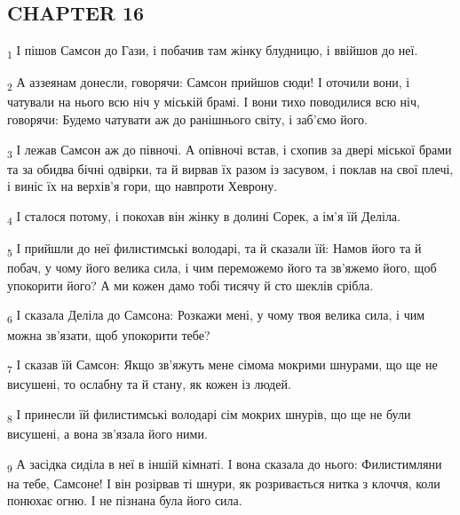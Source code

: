 \subsection{CHAPTER 16}
\begin{tcolorbox}
\textsubscript{1} І пішов Самсон до Гази, і побачив там жінку блудницю, і ввійшов до неї.
\end{tcolorbox}
\begin{tcolorbox}
\textsubscript{2} А аззеянам донесли, говорячи: Самсон прийшов сюди! І оточили вони, і чатували на нього всю ніч у міській брамі. І вони тихо поводилися всю ніч, говорячи: Будемо чатувати аж до ранішнього світу, і заб'ємо його.
\end{tcolorbox}
\begin{tcolorbox}
\textsubscript{3} І лежав Самсон аж до півночі. А опівночі встав, і схопив за двері міської брами та за обидва бічні одвірки, та й вирвав їх разом із засувом, і поклав на свої плечі, і виніс їх на верхів'я гори, що навпроти Хеврону.
\end{tcolorbox}
\begin{tcolorbox}
\textsubscript{4} І сталося потому, і покохав він жінку в долині Сорек, а ім'я їй Деліла.
\end{tcolorbox}
\begin{tcolorbox}
\textsubscript{5} І прийшли до неї филистимські володарі, та й сказали їй: Намов його та й побач, у чому його велика сила, і чим переможемо його та зв'яжемо його, щоб упокорити його? А ми кожен дамо тобі тисячу й сто шеклів срібла.
\end{tcolorbox}
\begin{tcolorbox}
\textsubscript{6} І сказала Деліла до Самсона: Розкажи мені, у чому твоя велика сила, і чим можна зв'язати, щоб упокорити тебе?
\end{tcolorbox}
\begin{tcolorbox}
\textsubscript{7} І сказав їй Самсон: Якщо зв'яжуть мене сімома мокрими шнурами, що ще не висушені, то ослабну та й стану, як кожен із людей.
\end{tcolorbox}
\begin{tcolorbox}
\textsubscript{8} І принесли їй филистимські володарі сім мокрих шнурів, що ще не були висушені, а вона зв'язала його ними.
\end{tcolorbox}
\begin{tcolorbox}
\textsubscript{9} А засідка сиділа в неї в іншій кімнаті. І вона сказала до нього: Филистимляни на тебе, Самсоне! І він розірвав ті шнури, як розривається нитка з клоччя, коли понюхає огню. І не пізнана була його сила.
\end{tcolorbox}
